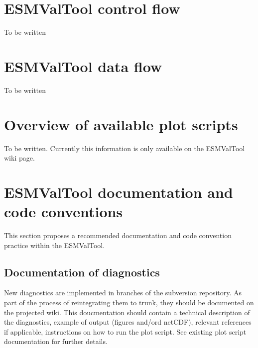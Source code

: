 \documentclass[12pt]{article}
\begin{document}
% 
% 
\section{ESMValTool control flow}\label{section:control_flow}
To be written




% 
% 
\section{ESMValTool data flow}\label{section:data_flow}
To be written




% 
% 
\section{Overview of available plot scripts}\label{section:overview_plot_types}
To be written. Currently this information is only available on the
ESMValTool wiki page\cite{ESMValTool_wiki}.






%
%
\section{ESMValTool documentation and code conventions}\label{section:code_conventions}
This section proposes a recommended documentation and code convention
practice within the ESMValTool. 

\subsection{Documentation of diagnostics}
New diagnostics are implemented in branches of the subversion
repository\cite{ESMValTool_repo}. As part of the process of
reintegrating them to trunk, they should be documented on the
projected wiki\cite{ESMValTool_wiki}. This doucmentation should
contain a technical description of the diagnostics, example of output
(figures and/ord netCDF), relevant references if applicable,
instructions on how to run the plot script. See existing plot script
documentation for further details.
\end{document}
